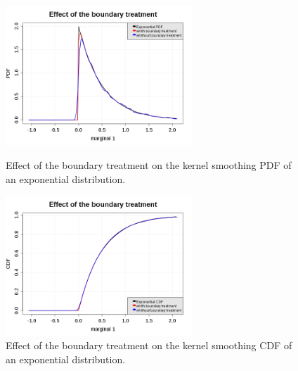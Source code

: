 \begin{figure}[H]
  \begin{minipage}{7cm}
    \begin{center}
      \includegraphics[width=7cm]{kernelSmoothing_boundary_pdf.png}
      \caption{Effect of the boundary treatment on the kernel smoothing PDF of an exponential distribution.}
      \label{pdf_KernelSmooth_boundary}
    \end{center}
  \end{minipage}
  \hfill
  \begin{minipage}{7cm}
    \begin{center}
      \includegraphics[width=7cm]{kernelSmoothing_boundary_cdf.png}
      \caption{Effect of the boundary treatment on the kernel smoothing CDF of an exponential distribution.}
      \label{cdf_KernelSmooth_boundary}
    \end{center}
  \end{minipage}
\end{figure}
